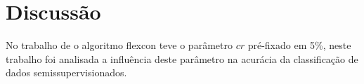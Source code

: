 \section{Discussão}
    \label{sec:discussao}
    
    No trabalho de  o algoritmo \ac{flexcon} teve o parâmetro $cr$ pré\hyp{fixado} em 5\%, neste trabalho foi analisada a influência deste parâmetro na acurácia da classificação de dados semissupervisionados.